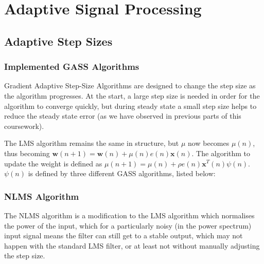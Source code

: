 \documentclass[./main.tex]{subfiles}
\begin{document}
\section{Adaptive Signal Processing}

\subsection{Adaptive Step Sizes}

\subsubsection{Implemented GASS Algorithms}
Gradient Adaptive Step-Size Algorithms are designed to change the step size as the algorithm progresses. At the start, a large step size is needed in order for the algorithm to converge quickly, but during steady state a small step size helps to reduce the steady state error (as we have observed in previous parts of this coursework).

The LMS algorithm remains the same in structure, but $\mu$ now becomes $\mu(n)$, thus becoming $  \mathbf{w}(n+1) = \mathbf{w}(n) + \mu(n) e(n) \mathbf{x}(n) $. The algorithm to update the weight is defined as $ \mu(n+1) = \mu(n) + \rho e(n) \mathbf{x}^T(n) \psi(n)$. $ \psi(n) $ is defined by three different GASS algorithms, listed below:


%



\subsubsection{NLMS Algorithm}

The NLMS algorithm is a modification to the LMS algorithm which normalises the power of the input, which for a particularly noisy (in the power spectrum) input signal means the filter can still get to a stable output, which may not happen with the standard LMS filter, or at least not without manually adjusting the step size.
\end{document}

